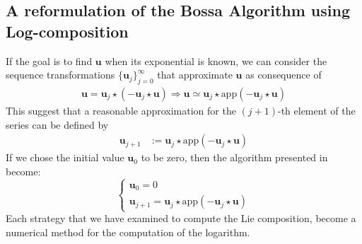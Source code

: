 \subsection{A reformulation of the Bossa Algorithm using Log-composition}

If the goal is to find $\mathbf{u}$ when its exponential is known, we can consider the sequence transformations $\{\mathbf{u}_{j}  \}_{j=0}^{\infty}$ that approximate $\mathbf{u}$ as consequence of
\begin{align*}
\mathbf{u} = \mathbf{u}_{j} \star  (-\mathbf{u}_{j}  \star  \mathbf{u} ) \Longrightarrow
\mathbf{u} \simeq \mathbf{u}_{j} \star  \text{app}(-\mathbf{u}_{j}  \star  \mathbf{u} )
\end{align*}
This suggest that a reasonable approximation for the $(j+1)$-th element of the series can be defined by
\begin{align*}
\mathbf{u}_{j+1} & :=  \mathbf{u}_{j} \star  \text{app}(-\mathbf{u}_{j}  \star  \mathbf{u} )
\end{align*}
If we chose the initial value $\mathbf{u}_{0}$ to be zero, then the algorithm presented in \cite{Bossa:08}  become:
\begin{equation}\label{eq:bossa_reformulated}
\begin{cases}
\mathbf{u}_0 = 0 \\
\mathbf{u}_{j+1} = \mathbf{u}_{j} \star  \text{app}(-\mathbf{u}_{j}  \star  \mathbf{u} )
\end{cases}
\end{equation}
Each strategy that we have examined to compute the Lie composition, become a numerical method for the computation of the logarithm.
